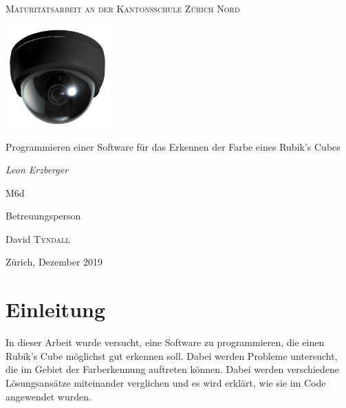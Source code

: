 \documentclass[a4paper, 12pt]{article}
\begin{document}
\begin{titlepage}
	\centering
	{\scshape\Large Maturitätsarbeit an der Kantonsschule Zürich Nord \par}
	\vspace{1cm}
	\includegraphics[width=0.3\textwidth]{Ueberwachungskamera}\par\vspace{1cm}
	\vspace{1cm}
	{\LARGE Programmieren einer Software für das Erkennen der Farbe eines Rubik's Cubes\par}
	\vspace{2cm}	
	{\Large\itshape Leon Erzberger\par}
	
	{\large M6d\par}
	\vfill
	Betreuungsperson\par
	David \textsc{Tyndall}

	\vfill

	{\large Zürich, Dezember 2019\par}
\end{titlepage}

\begin{abstract}%
\noindent
Ziel dieser Maturaarbeit war, ein möglichst gutes Programm für die Farberkennung eines Rubik's Cubes zu programmieren. Dafür wurden die beiden Farbräume RGB und HSV miteinander verglichen. Ausserdem wurde eine spezielle Methode für das Erkennen von schwarzen und weissen Feldern ausprobiert. Zum Schluss wurden dann noch zwei Methoden verglichen, die Korrekturen vornahmen, so dass jede Farbe exakt 9 mal vorkommt. Das ausschliessliche Verwenden von Hue zur Unterscheidung der Farben, das Benützen von der Methode, um weiss und schwarz loszuwerden, und das Verwenden einer der zwei Korrekturmethoden lieferte die besten Ergebnisse, mit durchschnittlich 8.5 Fehlern bei 54 Feldern.
\end{abstract}
\tableofcontents
\clearpage
{} 
\newpage
\section{Einleitung}
In dieser Arbeit wurde versucht, eine Software zu programmieren, die einen Rubik's Cube möglichst gut erkennen soll. Dabei werden Probleme untersucht, die im Gebiet der Farberkennung auftreten können. Dabei werden verschiedene Lösungsansätze miteinander verglichen und es wird erklärt, wie sie im Code angewendet wurden.
\end{document}
